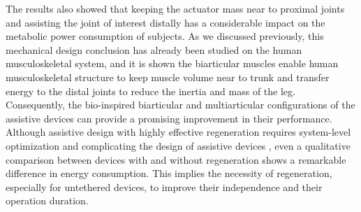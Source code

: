 \documentclass[10pt,letterpaper]{article}
\begin{document}
The results  also showed that keeping the actuator mass near to proximal joints and assisting the joint of interest distally has a considerable impact on the metabolic power consumption of subjects. As we discussed previously, this mechanical design conclusion has already been studied on the human musculoskeletal system, and it is shown the biarticular muscles enable human musculoskeletal structure to keep muscle volume near to trunk and transfer energy to the distal joints to reduce the inertia and mass of the leg. Consequently, the bio-inspired biarticular and multiarticular configurations of the assistive devices can provide a promising improvement in their performance.\\
Although assistive design with highly effective regeneration requires system-level optimization and complicating the design of assistive devices \cite{140}, even a qualitative comparison between devices with and without regeneration shows a remarkable difference in energy consumption. This implies the necessity of regeneration, especially for untethered devices, to improve their independence and their operation duration.\\
\end{document}
